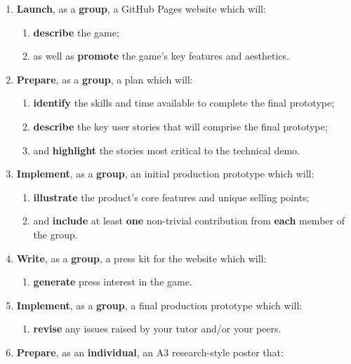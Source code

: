 \documentclass{../fal_assignment}
\begin{document}
\begin{enumerate}[label=(\Alph*)]
    \item \textbf{Launch}, as a \textbf{group}, a GitHub Pages website which will:
    	\begin{enumerate}[label=\roman*.]
    		\item \textbf{describe} the game;
    		\item as well as \textbf{promote} the game's key features and aesthetics.
	\end{enumerate}
    \item \textbf{Prepare}, as a \textbf{group}, a plan which will:
    	\begin{enumerate}[label=\roman*.]
    	    	\item \textbf{identify} the skills and time available to complete the final prototype;
    		\item \textbf{describe} the key user stories that will comprise the final prototype;
    		\item and \textbf{highlight} the stories most critical to the technical demo.
	\end{enumerate}
    \item \textbf{Implement}, as a \textbf{group}, an initial production prototype which will:
    	\begin{enumerate}[label=\roman*.]
    		\item \textbf{illustrate} the product's core features and unique selling points;
    		\item and \textbf{include} at least \textbf{one} non-trivial contribution from \textbf{each} member of the group.
	\end{enumerate}
    \item \textbf{Write}, as a \textbf{group}, a press kit for the website which will:
    	\begin{enumerate}[label=\roman*.]
    		\item \textbf{generate} press interest in the game.
	\end{enumerate}
    \item \textbf{Implement}, as a \textbf{group}, a final production prototype which will:
    	\begin{enumerate}[label=\roman*.]
    		\item \textbf{revise} any issues raised by your tutor and/or your peers.
	\end{enumerate}
    \item \textbf{Prepare}, as an \textbf{individual}, an A3 research-style poster that:

\end{enumerate}
\end{document}

